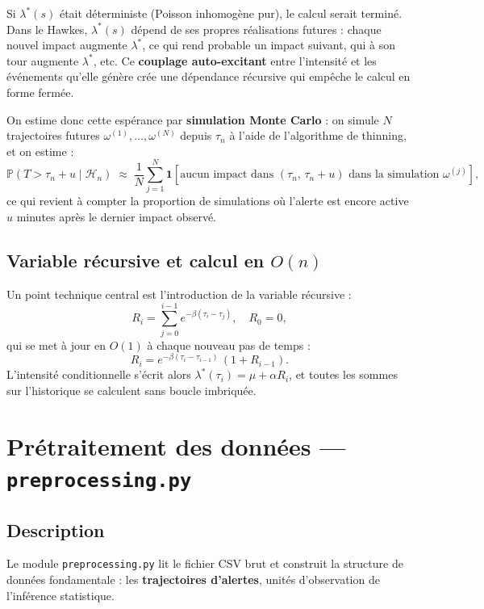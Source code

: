 \documentclass[a4paper,11pt]{article}
\begin{document}
Si $\lambda^*(s)$ était déterministe (Poisson inhomogène pur), le
calcul serait terminé. Dans le Hawkes, $\lambda^*(s)$ dépend de ses
propres réalisations futures : chaque nouvel impact augmente
$\lambda^*$, ce qui rend probable un impact suivant, qui à son tour
augmente $\lambda^*$, etc. Ce \textbf{couplage auto-excitant} entre
l'intensité et les événements qu'elle génère crée une dépendance
récursive qui empêche le calcul en forme fermée.

On estime donc cette espérance par \textbf{simulation Monte Carlo} :
on simule $N$ trajectoires futures $\omega^{(1)}, \ldots, \omega^{(N)}$
depuis $\tau_n$ à l'aide de l'algorithme de thinning, et on estime :
\[
    \mathbb{P}(T > \tau_n + u \mid \mathcal{H}_n)
    \;\approx\;
    \frac{1}{N}
    \sum_{j=1}^{N}
    \mathbf{1}\!\left[
      \text{aucun impact dans } (\tau_n,\, \tau_n + u)
      \text{ dans la simulation } \omega^{(j)}
    \right],
\]
ce qui revient à compter la proportion de simulations où l'alerte
est encore active $u$ minutes après le dernier impact observé.
\subsection{Variable récursive et calcul en $O(n)$}

Un point technique central est l'introduction de la variable récursive :
\[
R_i = \sum_{j=0}^{i-1} e^{-\beta(\tau_i - \tau_j)}, \quad R_0 = 0,
\]
qui se met à jour en $O(1)$ à chaque nouveau pas de temps :
\[
R_i = e^{-\beta(\tau_i - \tau_{i-1})}\,(1 + R_{i-1}).
\]
L'intensité conditionnelle s'écrit alors $\lambda^*(\tau_i) = \mu + \alpha R_i$, et toutes les sommes sur l'historique se calculent sans boucle imbriquée.

\section{Prétraitement des données --- \texttt{preprocessing.py}}

\subsection{Description}

Le module \texttt{preprocessing.py} lit le fichier CSV brut et construit la structure de données fondamentale : les \textbf{trajectoires d'alertes}, unités d'observation de l'inférence statistique.
\end{document}
